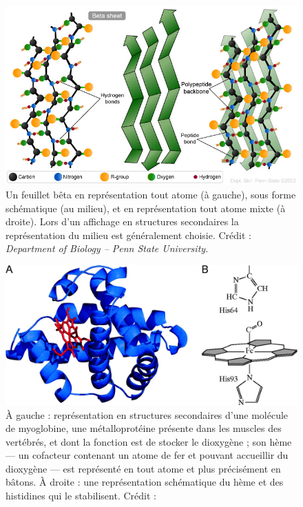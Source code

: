 	\begin{figure}[H]
		\centering
		\includegraphics[width=\textwidth]{figures/ch1/bSheet}
		\caption{Un feuillet bêta en représentation \og tout atome \fg{} (à gauche), sous forme schématique (au milieu), et en représentation \og tout atome \fg{} mixte (à droite). Lors d'un affichage \og en structures secondaires \fg{} la représentation du milieu est généralement choisie. Crédit : \emph{Department of Biology -- Penn State University.}}
		\label{fig:bSheet}
	\end{figure}
		
	\begin{figure}[H]
		\centering
		\includegraphics[width=\textwidth]{figures/ch1/myoglobin}
		\caption{À gauche : représentation en structures secondaires d'une molécule de myoglobine, une métalloprotéine présente dans les muscles des vertébrés, et dont la fonction est de stocker le dioxygène ; son hème --- un cofacteur contenant un atome de fer et pouvant accueillir du dioxygène --- est représenté en \og tout atome \fg{} et plus précisément en bâtons. À droite : une représentation schématique du hème et des histidines qui le stabilisent. Crédit :~\cite{Ordway3441}}
		\label{fig:myoglobin}
	\end{figure}
		
